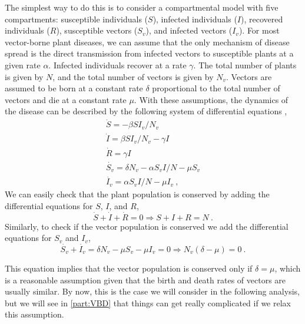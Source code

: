 The simplest way to do this is to consider a compartmental model with five
compartments: susceptible individuals ($S$), infected individuals ($I$),
recovered individuals ($R$), susceptible vectors ($S_v$), and infected vectors
($I_v$). For most vector-borne plant diseases, we can assume that the only
mechanism of disease spread is the direct transmission from infected vectors to
susceptible plants at a given rate $\alpha$. Infected individuals recover at
a rate $\gamma$. The total number of plants is given by $N$, and the total
number of vectors is given by $N_v$. Vectors are assumed to be born at a
constant rate $\delta$ proportional to the total number of vectors and die at a
constant rate $\mu$. With these assumptions, the dynamics of the disease can be
described by the following system of differential equations
\cite{Brauer2016},
\begin{equation}\label{eq: SIRV_model}
  \begin{array}{l}
    \dot{S}=-\beta SI_v/N_v                       \\
    \dot{I}=\beta SI_v/N_v -\gamma I              \\
    \dot{R}=\gamma I                              \\
    \dot{S_v}=\delta N_v -\alpha S_vI/N - \mu S_v \\
    \dot{I_v}=\alpha S_vI/N-\mu I_v \ ,
  \end{array}
\end{equation}
We can easily check that the plant population is conserved by adding the
differential equations for $S$, $I$, and $R$,
\begin{equation}
  \dot{S}+\dot{I}+\dot{R}=0\Longrightarrow S+I+R=N \ .
\end{equation}
Similarly, to check if the vector population is conserved we add the
differential equations for $S_v$ and $I_v$,
\begin{equation}
  \dot{S_v}+\dot{I_v}=\delta N_v -\mu S_v -\mu I_v=0\Longrightarrow
  N_v(\delta-\mu)=0 \ .
\end{equation}

This equation implies that the vector population is conserved only if
$\delta=\mu$, which is a reasonable assumption given that the birth and death
rates of vectors are usually similar. By now, this is the case we will
consider in the following analysis, but we will see in \cref{part:VBD}
that things can get really complicated if we relax this assumption.

